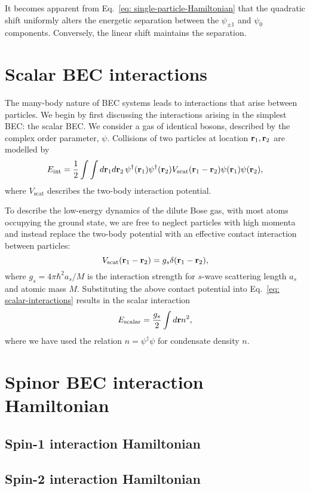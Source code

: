 It becomes apparent from Eq.~\eqref{eq: single-particle-Hamiltonian} that the
quadratic shift uniformly alters the energetic separation between the
\(\psi_{\pm 1}\) and \(\psi_0\) components.
Conversely, the linear shift maintains the separation.

\section{Scalar BEC interactions}
The many-body nature of BEC systems leads to interactions that arise between
particles.
We begin by first discussing the interactions arising in the simplest BEC\@: the
scalar BEC\@.
We consider a gas of identical bosons, described by the complex order parameter,
\(\psi \).
Collisions of two particles at location \(\vb{r}_1, \vb{r}_2\) are modelled by
\begin{equation}\label{eq: scalar-interactions}
    E_\mathrm{int} = \frac{1}{2}\int \int d\vb{r}_1d\vb{r}_2\,
    \psi^\dagger(\vb{r}_1)\psi^\dagger(\vb{r}_2)
    V_\mathrm{scat}(\vb{r}_1-\vb{r}_2)\psi(\vb{r}_1)\psi(\vb{r}_2),
\end{equation}
where \(V_\mathrm{scat}\) describes the two-body interaction potential.

To describe the low-energy dynamics of the dilute Bose gas, with most atoms
occupying the ground state, we are free to neglect particles with high momenta
and instead replace the two-body potential with an effective contact interaction
between particles:
\begin{equation}
    V_\mathrm{scat}(\vb{r}_1 - \vb{r}_2) = g_s\delta(\vb{r}_1 - \vb{r}_2),
\end{equation}
where \(g_s=4\pi\hbar^2a_s/M\) is the interaction strength for \(s\)-wave
scattering length \(a_s\) and atomic mass \(M\).
Substituting the above contact potential into
Eq.~\eqref{eq: scalar-interactions} results in the scalar interaction
\begin{equation}
    E_\mathrm{scalar} = \frac{g_s}{2}\int d\vb{r} n^2,
\end{equation}
where we have used the relation \(n = \psi^\dagger \psi \) for condensate
density \(n\).

\section{Spinor BEC interaction Hamiltonian}

\subsection{Spin-1 interaction Hamiltonian}

\subsection{Spin-2 interaction Hamiltonian}
